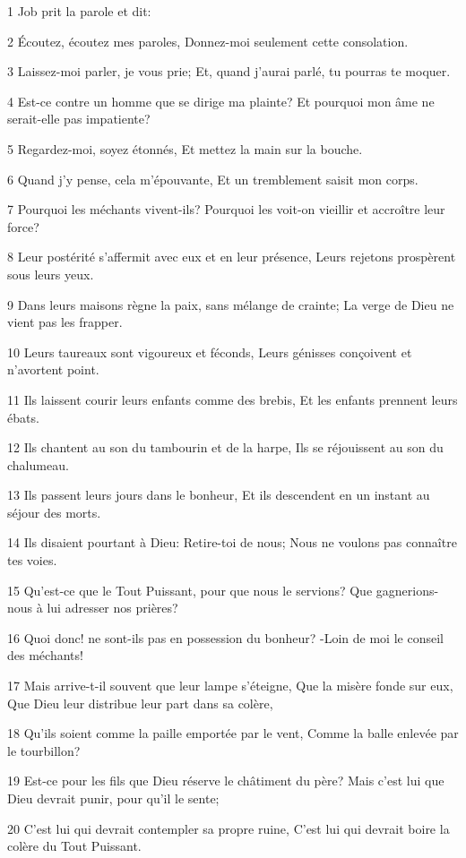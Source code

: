 \par 1 Job prit la parole et dit:
\par 2 Écoutez, écoutez mes paroles, Donnez-moi seulement cette consolation.
\par 3 Laissez-moi parler, je vous prie; Et, quand j'aurai parlé, tu pourras te moquer.
\par 4 Est-ce contre un homme que se dirige ma plainte? Et pourquoi mon âme ne serait-elle pas impatiente?
\par 5 Regardez-moi, soyez étonnés, Et mettez la main sur la bouche.
\par 6 Quand j'y pense, cela m'épouvante, Et un tremblement saisit mon corps.
\par 7 Pourquoi les méchants vivent-ils? Pourquoi les voit-on vieillir et accroître leur force?
\par 8 Leur postérité s'affermit avec eux et en leur présence, Leurs rejetons prospèrent sous leurs yeux.
\par 9 Dans leurs maisons règne la paix, sans mélange de crainte; La verge de Dieu ne vient pas les frapper.
\par 10 Leurs taureaux sont vigoureux et féconds, Leurs génisses conçoivent et n'avortent point.
\par 11 Ils laissent courir leurs enfants comme des brebis, Et les enfants prennent leurs ébats.
\par 12 Ils chantent au son du tambourin et de la harpe, Ils se réjouissent au son du chalumeau.
\par 13 Ils passent leurs jours dans le bonheur, Et ils descendent en un instant au séjour des morts.
\par 14 Ils disaient pourtant à Dieu: Retire-toi de nous; Nous ne voulons pas connaître tes voies.
\par 15 Qu'est-ce que le Tout Puissant, pour que nous le servions? Que gagnerions-nous à lui adresser nos prières?
\par 16 Quoi donc! ne sont-ils pas en possession du bonheur? -Loin de moi le conseil des méchants!
\par 17 Mais arrive-t-il souvent que leur lampe s'éteigne, Que la misère fonde sur eux, Que Dieu leur distribue leur part dans sa colère,
\par 18 Qu'ils soient comme la paille emportée par le vent, Comme la balle enlevée par le tourbillon?
\par 19 Est-ce pour les fils que Dieu réserve le châtiment du père? Mais c'est lui que Dieu devrait punir, pour qu'il le sente;
\par 20 C'est lui qui devrait contempler sa propre ruine, C'est lui qui devrait boire la colère du Tout Puissant.
